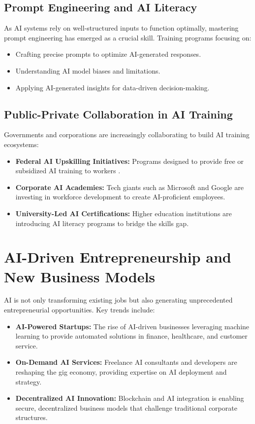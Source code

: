 \documentclass[a4paper,headinclude=on,footinclude=on,12pt,oneside]{scrbook}
\begin{document}
\subsection{Prompt Engineering and AI Literacy}

As AI systems rely on well-structured inputs to function optimally, mastering prompt engineering has emerged as a crucial skill. Training programs focusing on:
\begin{itemize}
	\item Crafting precise prompts to optimize AI-generated responses.
	\item Understanding AI model biases and limitations.
	\item Applying AI-generated insights for data-driven decision-making.
\end{itemize}

\subsection{Public-Private Collaboration in AI Training}

Governments and corporations are increasingly collaborating to build AI training ecosystems:
\begin{itemize}
	\item \textbf{Federal AI Upskilling Initiatives:} Programs designed to provide free or subsidized AI training to workers .
	\item \textbf{Corporate AI Academies:} Tech giants such as Microsoft and Google are investing in workforce development to create AI-proficient employees.
	\item \textbf{University-Led AI Certifications:} Higher education institutions are introducing AI literacy programs to bridge the skills gap.
\end{itemize}

\section{AI-Driven Entrepreneurship and New Business Models}

AI is not only transforming existing jobs but also generating unprecedented entrepreneurial opportunities. Key trends include:
\begin{itemize}
	\item \textbf{AI-Powered Startups:} The rise of AI-driven businesses leveraging machine learning to provide automated solutions in finance, healthcare, and customer service.
	\item \textbf{On-Demand AI Services:} Freelance AI consultants and developers are reshaping the gig economy, providing expertise on AI deployment and strategy.
	\item \textbf{Decentralized AI Innovation:} Blockchain and AI integration is enabling secure, decentralized business models that challenge traditional corporate structures.
\end{itemize}
\end{document}
